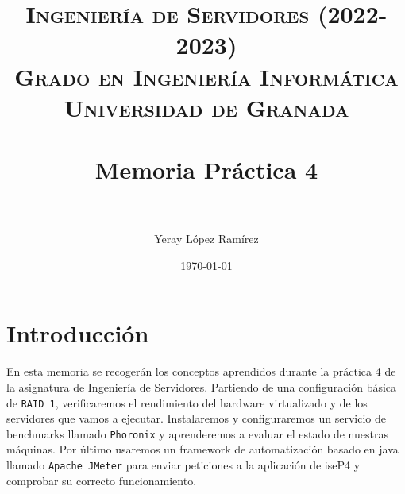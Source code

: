 

\title{	
\normalfont \normalsize 
\textsc{\textbf{Ingeniería de Servidores (2022-2023)} \\ Grado en Ingeniería Informática \\ Universidad de Granada} \\ [25pt] %
\horrule{0.5pt} \\[0.4cm] %
\huge Memoria Práctica 4 \\ %
\horrule{2pt} \\[0.5cm] %
}

\author{Yeray López Ramírez} %

\date{\normalsize\today} %



\maketitle %

\newpage %
\newcommand{\code}[1]{\colorbox{light-gray}{\textcolor{alizarin}{\texttt{#1}}}}
\newcommand{\high}[1]{\colorbox{light-gray}{\textcolor{nyellow}{\texttt{#1}}}}
\newcommand{\good}[1]{\colorbox{light-gray}{\textcolor{dark-green}{\texttt{#1}}}}
\tableofcontents %

\newpage

\section{Introducción}
En esta memoria se recogerán los conceptos aprendidos durante la práctica 4 de la asignatura de Ingeniería de Servidores. Partiendo de una configuración básica de \high{RAID 1}, verificaremos el rendimiento del hardware virtualizado y de los servidores que vamos a ejecutar. Instalaremos y configuraremos un servicio de benchmarks llamado \high{Phoronix} y aprenderemos a evaluar el estado de nuestras máquinas. Por último usaremos un framework de automatización basado en java llamado \high{Apache JMeter} para enviar peticiones a la aplicación de iseP4 y comprobar su correcto funcionamiento.

